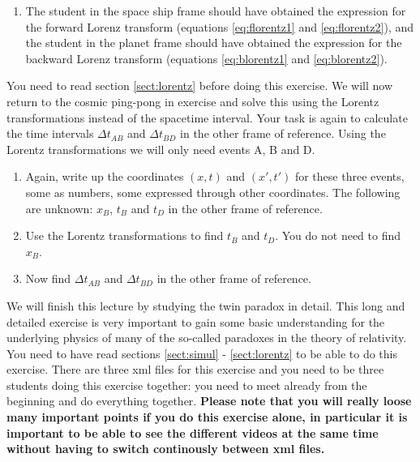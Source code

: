 {\begin{multicols}{2}
\begin{enumerate}
replace numbers with the following letters, $x_1$, $t_1$, $x_1'$, $t_1'$ as well as the time of event 2 in the other frame. Some of the times/positions are 0, these should not be replaced by letters. These 5 letters will be your unknown and you should not need to introduce more unknowns. {\bf Hint:} You will need to write the position of event 2 in your frame in terms of the velocity $v$ of the other frame as well as the time of event 2 in your frame. Look back at exercise  and see how a similar task was done there. Now write the events in terms of these letters and repeat the above calculations using the same space-time intervals.
\item The student in the space ship frame should have obtained the expression for the forward Lorenz transform (equations \ref{eq:florentz1} and \ref{eq:florentz2}), and the student in the planet frame should have obtained the expression for the backward Lorenz transform  (equations \ref{eq:blorentz1} and \ref{eq:blorentz2}).
\end{enumerate}


\vspace{0.5cm}


You need to read section \ref{sect:lorentz} before doing this exercise. We will now return to the cosmic ping-pong in exercise  and solve this using the Lorentz transformations instead of the spacetime interval. Your task is again to calculate the time intervals $\Delta t_{AB}$ and $\Delta t_{BD}$ in the other frame of reference. Using the Lorentz transformations we will only need events A, B and D.

\begin{enumerate}
\item Again, write up the coordinates $(x,t)$ and $(x',t')$ for these three events, some as numbers, some expressed through other coordinates. The following are unknown: $x_B$, $t_B$ and $t_D$ in the other frame of reference.
\item Use the Lorentz transformations to find $t_B$ and $t_D$. You do not need to find $x_B$.
\item Now find  $\Delta t_{AB}$ and $\Delta t_{BD}$ in the other frame of reference.
\end{enumerate}



We will finish this lecture by studying the twin paradox in detail. This long and detailed exercise is very important to gain some basic understanding for the underlying physics of many of the so-called paradoxes in the theory of relativity. You need to have read sections \ref{sect:simul} - \ref{sect:lorentz} to be able to do this exercise.
There are three xml files for this exercise and you need to be three students doing this exercise together: you need to meet already from the beginning and do everything together. {\bf Please note that you will really loose many important points if you do this exercise alone, in particular it is important to be able to see the different videos at the same time without having to switch continously between xml files.}


\end{multicols}}
